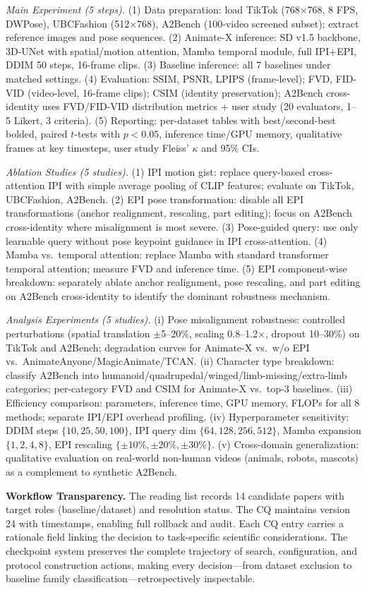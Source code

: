 \begin{tcolorbox}
\smallskip
\textit{Main Experiment (5 steps).} (1) Data preparation: load TikTok (768$\times$768, 8 FPS, DWPose), UBCFashion (512$\times$768), A2Bench (100-video screened subset); extract reference images and pose sequences. (2) Animate-X inference: SD v1.5 backbone, 3D-UNet with spatial/motion attention, Mamba temporal module, full IPI+EPI, DDIM 50 steps, 16-frame clips. (3) Baseline inference: all 7 baselines under matched settings. (4) Evaluation: SSIM, PSNR, LPIPS (frame-level); FVD, FID-VID (video-level, 16-frame clips); CSIM (identity preservation); A2Bench cross-identity uses FVD/FID-VID distribution metrics + user study (20 evaluators, 1--5 Likert, 3 criteria). (5) Reporting: per-dataset tables with best/second-best bolded, paired $t$-tests with $p<0.05$, inference time/GPU memory, qualitative frames at key timesteps, user study Fleiss' $\kappa$ and 95\% CIs.

\smallskip
\textit{Ablation Studies (5 studies).} (1) IPI motion gist: replace query-based cross-attention IPI with simple average pooling of CLIP features; evaluate on TikTok, UBCFashion, A2Bench. (2) EPI pose transformation: disable all EPI transformations (anchor realignment, rescaling, part editing); focus on A2Bench cross-identity where misalignment is most severe. (3) Pose-guided query: use only learnable query without pose keypoint guidance in IPI cross-attention. (4) Mamba vs.\ temporal attention: replace Mamba with standard transformer temporal attention; measure FVD and inference time. (5) EPI component-wise breakdown: separately ablate anchor realignment, pose rescaling, and part editing on A2Bench cross-identity to identify the dominant robustness mechanism.

\smallskip
\textit{Analysis Experiments (5 studies).} (i) Pose misalignment robustness: controlled perturbations (spatial translation $\pm$5--20\%, scaling 0.8--1.2$\times$, dropout 10--30\%) on TikTok and A2Bench; degradation curves for Animate-X vs.\ w/o EPI vs.\ AnimateAnyone/MagicAnimate/TCAN. (ii) Character type breakdown: classify A2Bench into humanoid/quadrupedal/winged/limb-missing/extra-limb categories; per-category FVD and CSIM for Animate-X vs.\ top-3 baselines. (iii) Efficiency comparison: parameters, inference time, GPU memory, FLOPs for all 8 methods; separate IPI/EPI overhead profiling. (iv) Hyperparameter sensitivity: DDIM steps $\{10,25,50,100\}$, IPI query dim $\{64,128,256,512\}$, Mamba expansion $\{1,2,4,8\}$, EPI rescaling $\{\pm10\%,\pm20\%,\pm30\%\}$. (v) Cross-domain generalization: qualitative evaluation on real-world non-human videos (animals, robots, mascots) as a complement to synthetic A2Bench.

\smallskip
\textbf{Workflow Transparency.} The reading list records 14 candidate papers with target roles (baseline/dataset) and resolution status. The CQ maintains version 24 with timestamps, enabling full rollback and audit. Each CQ entry carries a rationale field linking the decision to task-specific scientific considerations. The checkpoint system preserves the complete trajectory of search, configuration, and protocol construction actions, making every decision---from dataset exclusion to baseline family classification---retrospectively inspectable.
\end{tcolorbox}

